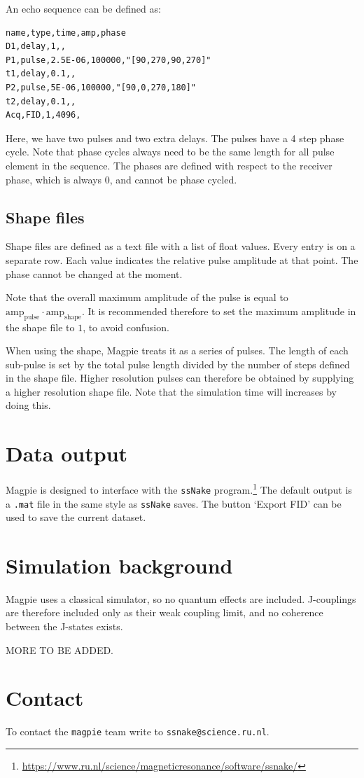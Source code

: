 \documentclass[11pt,a4paper]{article}
\begin{document}
An echo sequence can be defined as:

\begin{verbatim}
name,type,time,amp,phase
D1,delay,1,,
P1,pulse,2.5E-06,100000,"[90,270,90,270]"
t1,delay,0.1,,
P2,pulse,5E-06,100000,"[90,0,270,180]"
t2,delay,0.1,,
Acq,FID,1,4096,
\end{verbatim}
Here, we have two pulses and two extra delays. The pulses have a 4 step phase cycle. Note that phase cycles always need to be the same length for all pulse element in the sequence. The phases are defined with respect to the receiver phase, which is always 0, and cannot be phase cycled.


\subsection{Shape files}\label{sec:shape}
Shape files are defined as a text file with a list of float values. Every entry is on a separate row. Each value indicates the relative pulse amplitude at that point. The phase cannot be changed at the moment.

Note that the overall maximum amplitude of the pulse is equal to $\text{amp}_\text{pulse} \cdot \text{amp}_\text{shape}$. It is recommended therefore to set the maximum amplitude in the shape file to $1$, to avoid confusion.

When using the shape, Magpie treats it as a series of pulses. The length of each sub-pulse is set by the total pulse length divided by the number of steps defined in the shape file. Higher resolution pulses can therefore be obtained by supplying a higher resolution shape file. Note that the simulation time will increases by doing this.




\section{Data output}
Magpie is designed to interface with the \texttt{ssNake} program.\footnote{\url{https://www.ru.nl/science/magneticresonance/software/ssnake/}} The default output is a \texttt{.mat} file in the same style as \texttt{ssNake} saves. The button `Export FID' can be used to save the current dataset.



\section{Simulation background}
Magpie uses a classical simulator, so no quantum effects are included. J-couplings are therefore included only as their weak coupling limit, and no coherence between the J-states exists.

MORE TO BE ADDED.


\section{Contact}
To contact the \texttt{magpie} team write to \texttt{ssnake@science.ru.nl}.



\end{document}
